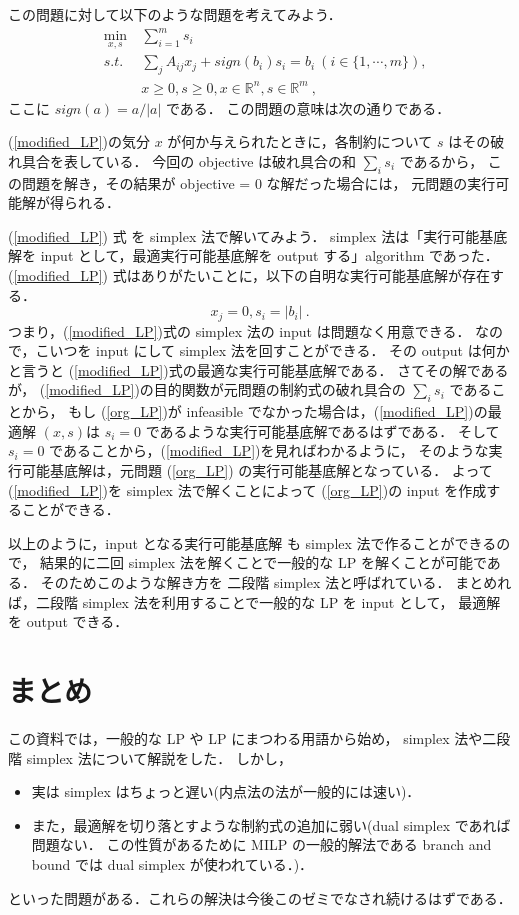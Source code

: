 \documentclass[11pt, a4]{article}
\begin{document}
この問題に対して以下のような問題を考えてみよう．
\begin{eqnarray}
  &\min_{x, s}&\ \sum_{i = 1}^m s_i \nonumber\\
  &s.t.&\ \sum_jA_{ij}x_j + sign(b_i) s_i = b_i\ (i \in \{1, \cdots, m\}) , \nonumber\\
  &\ &\ x\geq 0, s\geq 0, x \in \mathbb{R}^n, s \in \mathbb{R}^m\ ,
  \label{modified_LP}
\end{eqnarray}
ここに $sign(a) = a/|a|$ である．
この問題の意味は次の通りである．

\begin{itembox}[l]{(\ref{modified_LP})の気分}
$x$ が何か与えられたときに，各制約について $s$ はその破れ具合を表している．
今回の objective は破れ具合の和 $\sum_i s_i$ であるから，
この問題を解き，その結果が objective = 0 な解だった場合には，
元問題の実行可能解が得られる．
\end{itembox}

(\ref{modified_LP}) 式 を simplex 法で解いてみよう．
simplex 法は「実行可能基底解を input として，最適実行可能基底解を output する」algorithm であった．
(\ref{modified_LP}) 式はありがたいことに，以下の自明な実行可能基底解が存在する．
\begin{equation}
  x_j = 0, s_i = |b_i|\ .
\end{equation}
つまり，(\ref{modified_LP})式の simplex 法の input は問題なく用意できる．
なので，こいつを input にして simplex 法を回すことができる．
その output は何かと言うと (\ref{modified_LP})式の最適な実行可能基底解である．
さてその解であるが，
(\ref{modified_LP})の目的関数が元問題の制約式の破れ具合の $\sum_i s_i$ であることから，
もし (\ref{org_LP})が infeasible でなかった場合は，(\ref{modified_LP})の最適解 $(x, s)$は
$s_i = 0$ であるような実行可能基底解であるはずである．
そして $s_i = 0$ であることから，(\ref{modified_LP})を見ればわかるように，
そのような実行可能基底解は，元問題 (\ref{org_LP}) の実行可能基底解となっている．
よって(\ref{modified_LP})を simplex 法で解くことによって (\ref{org_LP})の
input を作成することができる．

以上のように，input となる実行可能基底解 も simplex 法で作ることができるので，
結果的に二回 simplex 法を解くことで一般的な LP を解くことが可能である．
そのためこのような解き方を 二段階 simplex 法と呼ばれている．
まとめれば，二段階 simplex 法を利用することで一般的な LP を input として，
最適解を output できる．

\section{まとめ}
この資料では，一般的な LP や LP にまつわる用語から始め，
simplex 法や二段階 simplex 法について解説をした．
しかし，
\begin{itemize}
\item 実は simplex はちょっと遅い(内点法の法が一般的には速い)．
\item また，最適解を切り落とすような制約式の追加に弱い(dual simplex であれば問題ない．
この性質があるために MILP の一般的解法である branch and bound では dual simplex が使われている．)．
\end{itemize}
といった問題がある．これらの解決は今後このゼミでなされ続けるはずである．
\end{document}
